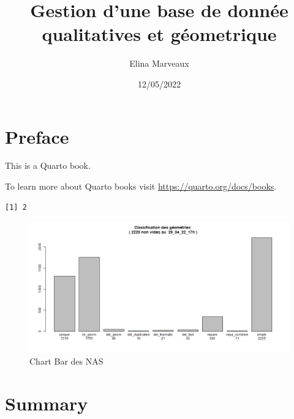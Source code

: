 \documentclass[
  a4paper,
]{scrbook}
\title{Gestion d'une base de donnée qualitatives et géometrique}
\author{Elina Marveaux}
\date{12/05/2022}
\renewcommand*\contentsname{Table of contents}
\newcommand\contentsname{Table of contents}
\begin{document}
\frontmatter
\maketitle

\ifdefined\Shaded\renewenvironment{Shaded}{\begin{tcolorbox}[interior hidden, boxrule=0pt, sharp corners, enhanced, frame hidden, borderline west={3pt}{0pt}{shadecolor}, breakable]}{\end{tcolorbox}}\fi

\renewcommand*\contentsname{Table des matières}
{
\setcounter{tocdepth}{2}
\tableofcontents
}
\listoffigures
\listoftables
\mainmatter
\hypertarget{preface}{%
\chapter*{Preface}\label{preface}}

This is a Quarto book.

To learn more about Quarto books visit
\url{https://quarto.org/docs/books}.

\begin{verbatim}
[1] 2
\end{verbatim}

\begin{figure}

{\centering \includegraphics{./figures/bar_classify_Del_29_04_22_17h.png}

}

\caption{Chart Bar des NAS}

\end{figure}

\hypertarget{summary}{%
\chapter{Summary}\label{summary}}
\end{document}

